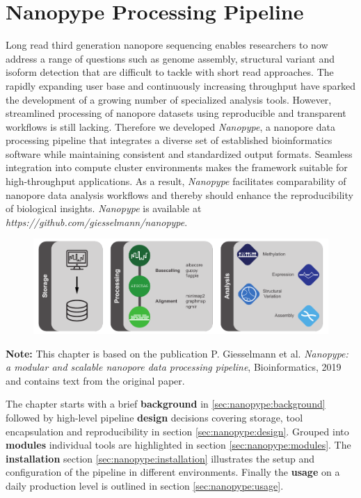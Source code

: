 \chapter{Nanopype Processing Pipeline}
\label{cha:nanopype}

Long read third generation nanopore sequencing enables researchers to now address a range of questions such as genome assembly, structural variant and isoform detection that are difficult to tackle with short read approaches. The rapidly expanding user base and continuously increasing throughput have sparked the development of a growing number of specialized analysis tools. However, streamlined processing of nanopore datasets using reproducible and transparent workflows is still lacking. Therefore we developed \textit{Nanopype}, a nanopore data processing pipeline that integrates a diverse set of established bioinformatics software while maintaining consistent and standardized output formats. Seamless integration into compute cluster environments makes the framework suitable for high-throughput applications. As a result, \textit{Nanopype} facilitates comparability of nanopore data analysis workflows and thereby should enhance the reproducibility of biological insights. \textit{Nanopype} is available at \textit{https://github.com/giesselmann/nanopype}.

\begin{figure}[h]
    \centering
    \includegraphics[width=1.0\textwidth]{figures/nanopype/GA.pdf}
    \label{fig:nanopype:ga}
\end{figure}

\textbf{Note:} This chapter is based on the publication P. Giesselmann et al. \textit{Nanopype: a modular and scalable nanopore data processing pipeline}, Bioinformatics, 2019 and contains text from the original paper.

The chapter starts with a brief \textbf{background} in \ref{sec:nanopype:background} followed by high-level pipeline \textbf{design} decisions covering storage, tool encapsulation and reproducibility in section \ref{sec:nanopype:design}. Grouped into \textbf{modules} individual tools are highlighted in section \ref{sec:nanopype:modules}.
The \textbf{installation} section \ref{sec:nanopype:installation} illustrates the setup and configuration of the pipeline in different environments. 
Finally the \textbf{usage} on a daily production level is outlined in section \ref{sec:nanopype:usage}.




